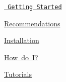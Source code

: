
\begin{DoxyItemize}
\item \href{/}{\texttt{ Getting Started}}
\item \mbox{\hyperlink{md_docs_recommendations}{Recommendations}}
\item \mbox{\hyperlink{md_docs_installation}{Installation}}
\item \mbox{\hyperlink{md_docs_howdoi}{How do I?}}
\item \mbox{\hyperlink{md_docs_tutorials}{Tutorials}} 
\end{DoxyItemize}